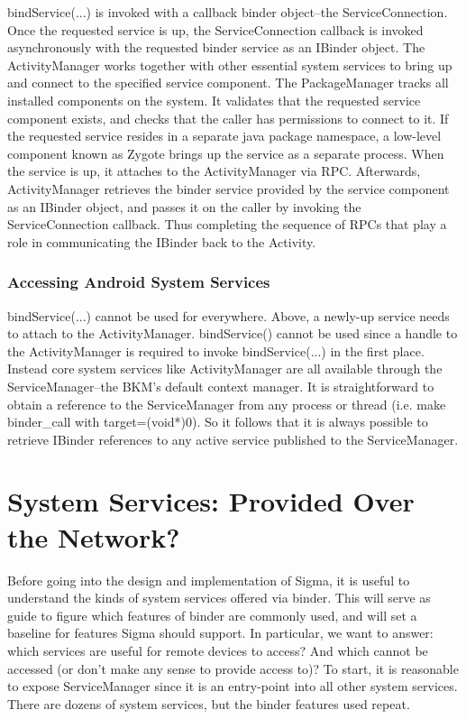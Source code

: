 \documentclass[prodmode]{acmlarge}
\begin{document}
bindService(...) is invoked with a callback binder object--the ServiceConnection. Once the requested service is up, the ServiceConnection callback is invoked asynchronously with the requested binder service as an IBinder object. The ActivityManager works together with other essential system services to bring up and connect to the specified service component. The PackageManager tracks all installed components on the system. It validates that the requested service component exists, and checks that the caller has permissions to connect to it. If the requested service resides in a separate java package namespace, a low-level component known as Zygote brings up the service as a separate process. When the service is up, it attaches to the ActivityManager via RPC. Afterwards, ActivityManager retrieves the binder service provided by the service component as an IBinder object, and passes it on the caller by invoking the ServiceConnection callback. Thus completing the sequence of RPCs that play a role in communicating the IBinder back to the Activity.

\subsubsection{Accessing Android System Services}
bindService(...) cannot be used for everywhere. Above, a newly-up service needs to attach to the ActivityManager. bindService() cannot be used since a handle to the ActivityManager is required to invoke bindService(...) in the first place. Instead core system services like ActivityManager are all available through the ServiceManager--the BKM's default context manager. It is straightforward to obtain a reference to the ServiceManager from any process or thread (i.e. make binder\_call with target=(void*)0). So it follows that it is always possible to retrieve IBinder references to any active service published to the ServiceManager.

\section{System Services: Provided Over the Network?}
\label{sec:SystemServices}
Before going into the design and implementation of Sigma, it is useful to understand the kinds of system services offered via binder. This will serve as guide to figure which features of binder are commonly used, and will set a baseline for features Sigma should support. In particular, we want to answer: which services are useful for remote devices to access? And which cannot be accessed (or don't make any sense to provide access to)?  To start, it is reasonable to expose ServiceManager since it is an entry-point into all other system services. There are dozens of system services, but the binder features used repeat.
\end{document}
